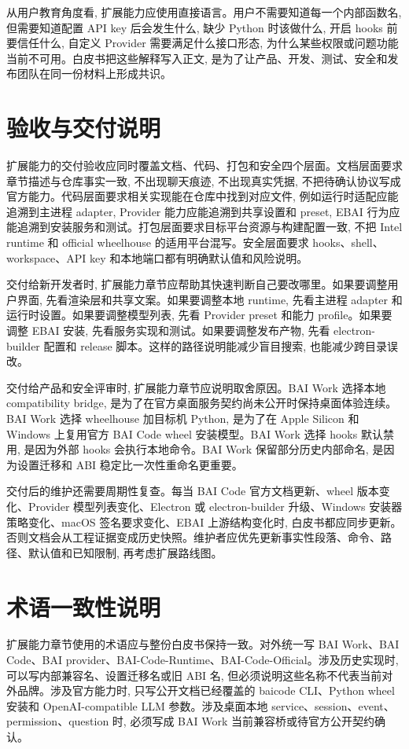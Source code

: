 从用户教育角度看, 扩展能力应使用直接语言。用户不需要知道每一个内部函数名, 但需要知道配置 API key 后会发生什么, 缺少 Python 时该做什么, 开启 hooks 前要信任什么, 自定义 Provider 需要满足什么接口形态, 为什么某些权限或问题功能当前不可用。白皮书把这些解释写入正文, 是为了让产品、开发、测试、安全和发布团队在同一份材料上形成共识。

\section{验收与交付说明}
扩展能力的交付验收应同时覆盖文档、代码、打包和安全四个层面。文档层面要求章节描述与仓库事实一致, 不出现聊天痕迹, 不出现真实凭据, 不把待确认协议写成官方能力。代码层面要求相关实现能在仓库中找到对应文件, 例如运行时适配应能追溯到主进程 adapter, Provider 能力应能追溯到共享设置和 preset, EBAI 行为应能追溯到安装服务和测试。打包层面要求目标平台资源与构建配置一致, 不把 Intel runtime 和 official wheelhouse 的适用平台混写。安全层面要求 hooks、shell、workspace、API key 和本地端口都有明确默认值和风险说明。

交付给新开发者时, 扩展能力章节应帮助其快速判断自己要改哪里。如果要调整用户界面, 先看渲染层和共享文案。如果要调整本地 runtime, 先看主进程 adapter 和运行时设置。如果要调整模型列表, 先看 Provider preset 和能力 profile。如果要调整 EBAI 安装, 先看服务实现和测试。如果要调整发布产物, 先看 electron-builder 配置和 release 脚本。这样的路径说明能减少盲目搜索, 也能减少跨目录误改。

交付给产品和安全评审时, 扩展能力章节应说明取舍原因。BAI Work 选择本地 compatibility bridge, 是为了在官方桌面服务契约尚未公开时保持桌面体验连续。BAI Work 选择 wheelhouse 加目标机 Python, 是为了在 Apple Silicon 和 Windows 上复用官方 BAI Code wheel 安装模型。BAI Work 选择 hooks 默认禁用, 是因为外部 hooks 会执行本地命令。BAI Work 保留部分历史内部命名, 是因为设置迁移和 ABI 稳定比一次性重命名更重要。

交付后的维护还需要周期性复查。每当 BAI Code 官方文档更新、wheel 版本变化、Provider 模型列表变化、Electron 或 electron-builder 升级、Windows 安装器策略变化、macOS 签名要求变化、EBAI 上游结构变化时, 白皮书都应同步更新。否则文档会从工程证据变成历史快照。维护者应优先更新事实性段落、命令、路径、默认值和已知限制, 再考虑扩展路线图。

\section{术语一致性说明}
扩展能力章节使用的术语应与整份白皮书保持一致。对外统一写 BAI Work、BAI Code、BAI provider、BAI-Code-Runtime、BAI-Code-Official。涉及历史实现时, 可以写内部兼容名、设置迁移名或旧 ABI 名, 但必须说明这些名称不代表当前对外品牌。涉及官方能力时, 只写公开文档已经覆盖的 baicode CLI、Python wheel 安装和 OpenAI-compatible LLM 参数。涉及桌面本地 service、session、event、permission、question 时, 必须写成 BAI Work 当前兼容桥或待官方公开契约确认。

